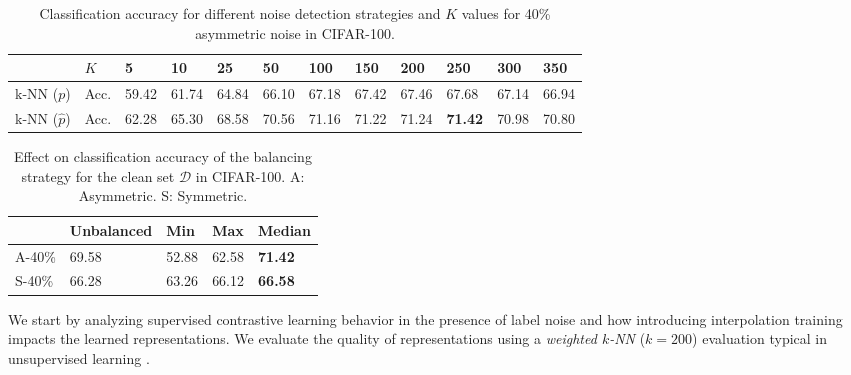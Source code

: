 \documentclass[final]{cvpr}
\begin{document}
\begin{table*}[t]
\begin{centering}
\caption{\label{tab:NoiseDetStudy}Classification accuracy for different noise detection strategies and $K$ values for 40\% asymmetric noise in CIFAR-100.}
\medskip{}
\par\end{centering}
\centering{}\setlength{\tabcolsep}{4pt}{\small{}}\begin{tabular}{llllllllllll}
\toprule
 & {\small{}$K$} & {\small{}5} & {\small{}10} & {\small{}25} & {\small{}50} & {\small{}100} & {\small{}150} & {\small{}200} & {\small{}250} & {\small{}300} & {\small{}350}\tabularnewline
\midrule
{\small{}k-NN ($p$)} & {\small{}Acc.} & {\small{}59.42} & {\small{}61.74} & {\small{}64.84} & {\small{}66.10} & {\small{}67.18} & {\small{}67.42} & {\small{}67.46} & {\small{}67.68} & {\small{}67.14} & {\small{}66.94}\tabularnewline

{\small{}k-NN ($\hat{p}$)} & {\small{}Acc.} & {\small{}62.28} & {\small{}65.30} & {\small{}68.58} & {\small{}70.56} & {\small{}71.16} & {\small{}71.22} & {\small{}71.24} & \textbf{\small{}71.42} & {\small{}70.98} & {\small{}70.80}\tabularnewline
\bottomrule
\end{tabular}{\small\par}
\end{table*}
\begin{table}[t]
\centering{}\caption{\label{tab:Effect-of-balancing}Effect on classification accuracy of the balancing strategy for  the clean set  $\mathcal{D}$ in CIFAR-100.
A: Asymmetric. S: Symmetric.}
\medskip{}
{\small{}}\begin{tabularx}{\columnwidth}{Xllll}
\toprule
 & {\small{}Unbalanced} & {\small{}Min} & {\small{}Max} & {\small{}Median}\tabularnewline
\midrule
{\small{}A-40\%} & {\small{}69.58} & {\small{}52.88} & {\small{}62.58} & \textbf{\small{}71.42}\tabularnewline

{\small{}S-40\%} & {\small{}66.28} & {\small{}63.26} & {\small{}66.12} & \textbf{\small{}66.58}\tabularnewline
\bottomrule
\end{tabularx}
\end{table}
We start by analyzing supervised contrastive learning behavior in the presence of label noise and how introducing interpolation training impacts the learned representations. We evaluate the quality of  representations using a \emph{weighted $k$-NN} ($k=200$) evaluation typical in unsupervised learning \cite{2019_ICML_AND}.
\end{document}
